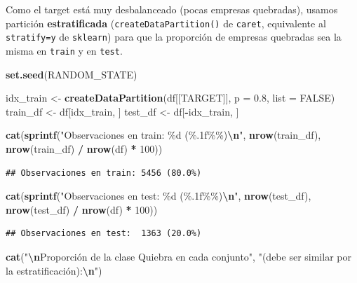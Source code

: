 \documentclass[
]{book}
\newenvironment{Shaded}{\begin{snugshade}}{\end{snugshade}}
\newcommand{\AttributeTok}[1]{\textcolor[rgb]{0.13,0.29,0.53}{#1}}
\newcommand{\ConstantTok}[1]{\textcolor[rgb]{0.56,0.35,0.01}{#1}}
\newcommand{\DecValTok}[1]{\textcolor[rgb]{0.00,0.00,0.81}{#1}}
\newcommand{\FloatTok}[1]{\textcolor[rgb]{0.00,0.00,0.81}{#1}}
\newcommand{\FunctionTok}[1]{\textcolor[rgb]{0.13,0.29,0.53}{\textbf{#1}}}
\newcommand{\NormalTok}[1]{#1}
\newcommand{\OtherTok}[1]{\textcolor[rgb]{0.56,0.35,0.01}{#1}}
\newcommand{\SpecialCharTok}[1]{\textcolor[rgb]{0.81,0.36,0.00}{\textbf{#1}}}
\newcommand{\StringTok}[1]{\textcolor[rgb]{0.31,0.60,0.02}{#1}}
\begin{document}
Como el target está muy desbalanceado (pocas empresas quebradas), usamos partición
\textbf{estratificada} (\texttt{createDataPartition()} de \texttt{caret}, equivalente al
\texttt{stratify=y} de \texttt{sklearn}) para que la proporción de empresas quebradas sea la
misma en \texttt{train} y en \texttt{test}.

\begin{Shaded}
\begin{Highlighting}[]
\FunctionTok{set.seed}\NormalTok{(RANDOM\_STATE)}

\NormalTok{idx\_train }\OtherTok{\textless{}{-}} \FunctionTok{createDataPartition}\NormalTok{(df[[TARGET]], }\AttributeTok{p =} \FloatTok{0.8}\NormalTok{, }\AttributeTok{list =} \ConstantTok{FALSE}\NormalTok{)}
\NormalTok{train\_df  }\OtherTok{\textless{}{-}}\NormalTok{ df[idx\_train, ]}
\NormalTok{test\_df   }\OtherTok{\textless{}{-}}\NormalTok{ df[}\SpecialCharTok{{-}}\NormalTok{idx\_train, ]}

\FunctionTok{cat}\NormalTok{(}\FunctionTok{sprintf}\NormalTok{(}\StringTok{"Observaciones en train: \%d (\%.1f\%\%)}\SpecialCharTok{\textbackslash{}n}\StringTok{"}\NormalTok{,}
            \FunctionTok{nrow}\NormalTok{(train\_df), }\FunctionTok{nrow}\NormalTok{(train\_df) }\SpecialCharTok{/} \FunctionTok{nrow}\NormalTok{(df) }\SpecialCharTok{*} \DecValTok{100}\NormalTok{))}
\end{Highlighting}
\end{Shaded}

\begin{verbatim}
## Observaciones en train: 5456 (80.0%)
\end{verbatim}

\begin{Shaded}
\begin{Highlighting}[]
\FunctionTok{cat}\NormalTok{(}\FunctionTok{sprintf}\NormalTok{(}\StringTok{"Observaciones en test:  \%d (\%.1f\%\%)}\SpecialCharTok{\textbackslash{}n}\StringTok{"}\NormalTok{,}
            \FunctionTok{nrow}\NormalTok{(test\_df), }\FunctionTok{nrow}\NormalTok{(test\_df) }\SpecialCharTok{/} \FunctionTok{nrow}\NormalTok{(df) }\SpecialCharTok{*} \DecValTok{100}\NormalTok{))}
\end{Highlighting}
\end{Shaded}

\begin{verbatim}
## Observaciones en test:  1363 (20.0%)
\end{verbatim}

\begin{Shaded}
\begin{Highlighting}[]
\FunctionTok{cat}\NormalTok{(}\StringTok{"}\SpecialCharTok{\textbackslash{}n}\StringTok{Proporción de la clase \textquotesingle{}Quiebra\textquotesingle{} en cada conjunto"}\NormalTok{,}
    \StringTok{"(debe ser similar por la estratificación):}\SpecialCharTok{\textbackslash{}n}\StringTok{"}\NormalTok{)}
\end{Highlighting}
\end{Shaded}
\end{document}
